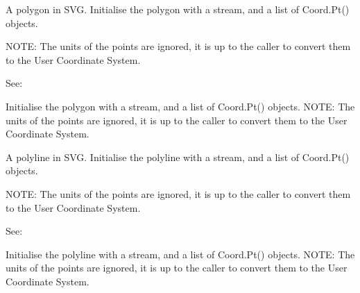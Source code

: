 \documentclass[letterpaper,10pt,english]{sphinxmanual}
\begin{document}

\begin{fulllineitems}
\label{\detokenize{ref/util/plot/SVGWriter:TotalDepth.util.plot.SVGWriter.SVGPolygon}}
A polygon in SVG. Initialise the polygon with a stream, and a list of Coord.Pt() objects.

NOTE: The units of the points are ignored, it is up to the caller to convert
them to the User Coordinate System.

See: 

\begin{fulllineitems}
\label{\detokenize{ref/util/plot/SVGWriter:TotalDepth.util.plot.SVGWriter.SVGPolygon.__init__}}
Initialise the polygon with a stream, and a list of Coord.Pt() objects.
NOTE: The units of the points are ignored, it is up to the caller to convert
them to the User Coordinate System.

\end{fulllineitems}


\end{fulllineitems}


\begin{fulllineitems}
\label{\detokenize{ref/util/plot/SVGWriter:TotalDepth.util.plot.SVGWriter.SVGPolyline}}
A polyline in SVG. Initialise the polyline with a stream, and a list of Coord.Pt() objects.

NOTE: The units of the points are ignored, it is up to the caller to convert
them to the User Coordinate System.

See: 

\begin{fulllineitems}
\label{\detokenize{ref/util/plot/SVGWriter:TotalDepth.util.plot.SVGWriter.SVGPolyline.__init__}}
Initialise the polyline with a stream, and a list of Coord.Pt() objects.
NOTE: The units of the points are ignored, it is up to the caller to convert
them to the User Coordinate System.

\end{fulllineitems}


\end{fulllineitems}
\end{document}
